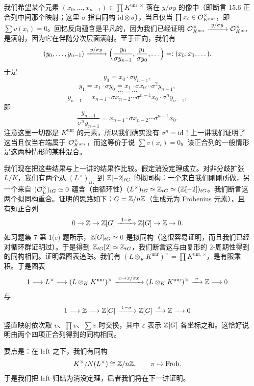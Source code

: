 我们希望某个元素 $(x_{0},\dots,x_{n-1})\in\prod K^{\mathrm{unr},\times}$ 落在 $y/\sigma y$ 的像中（即断言 15.6 正合列中间那个映射；这里 $\sigma$ 指自同构 $\mathrm{id}\otimes\sigma$），当且仅当 $\prod x_{i}\in\mathcal{O}_{K^{\mathrm{unr}}}^{\times}$，即 $\sum v(x_{i})=0$。回忆反向蕴含是平凡的，因为我们已经证明 $\OK_{K^{\mathrm{unr}}}^{\times}\xrightarrow{\ y/\sigma y\ }\OK_{K^{\mathrm{unr}}}^{\times}$ 是满射，因为它在伴随分次层面满射。至于正向，我们有
\[
(y_{0},\dots,y_{n-1})\xrightarrow{\ y/\sigma y\ }\Bigl(\frac{y_{0}}{\sigma y_{n-1}},\frac{y_{1}}{\sigma y_{0}},\dots\Bigr)=:(x_{0},x_{1},\dots).
\]
于是
\[
y_{0}=x_{0}\cdot\sigma y_{n-1},
\]
\[
y_{1}=x_{1}\cdot\sigma y_{0}=x_{1}\cdot\sigma x_{0}\cdots\sigma^{2}y_{n-1},
\]
\[
\cdots=\cdots
\]
\[
y_{n-1}=x_{n-1}\cdot\sigma x_{n-2}\cdots\sigma^{n-1}x_{0}\cdot\sigma^{n}y_{n-1},
\]
即
\[
\frac{y_{n-1}}{\sigma^{n}y_{n-1}}=x_{n-1}\cdot\sigma x_{n-2}\cdots\sigma^{n-1}x_{0}.
\]
注意这里一切都是 $K^{\mathrm{unr}}$ 的元素，所以我们确实没有 $\sigma^{n}=\mathrm{id}$！上一讲我们证明了这当且仅当右端属于 $\mathcal{O}_{K^{\mathrm{unr}}}^{\times}$，而这等价于说 $\sum v(x_{i})=0$。该正合列的一般情形是这两种情形的某种混合。

我们现在把这些结果与上一讲的结果作比较。假定消没定理成立。对非分歧扩张 $L/K$，我们有两个从 $(L^{\times})_{tG}$ 到 $\mathbb{Z}[-2]_{tG}$ 的拟同构：一个来自我们刚刚所做，另一个来自 $(\mathcal{O}_{L}^{\times})_{tG}\simeq 0$ 蕴含（由循环性）$(L^{\times})_{tG}\simeq\mathbb{Z}_{tG}\simeq(\mathbb{Z}[-2])_{tG}$。我们断言这两个拟同构重合。证明的思路如下：$G=\mathbb{Z}/n\mathbb{Z}$（生成元为 Frobenius 元素），且有短正合列
\[
0\to\Z\to\Z[G]\xrightarrow{\ 1-\sigma\ }\Z[G]\to\Z\to 0.
\]
如习题集 7 第 1(e) 题所示，$\mathbb{Z}[G]_{tG}\simeq 0$ 是拟同构（这很容易证明，而且我们已经对循环群证明过）。于是得到 $\mathbb{Z}_{tG}[2]\simeq\mathbb{Z}_{tG}$，我们断言这与由复形的 $2$-周期性得到的同构相同。证明靠图表追踪。我们有 $(L\otimes_{K}K^{\mathrm{unr}})^{\times}=\prod K^{\mathrm{unr},\times}$，是有限乘积。于是图表
\[
1\longrightarrow L^{\times}\longrightarrow(L\otimes_{K}K^{\mathrm{unr}})^{\times}\xrightarrow{\ x\mapsto x/\sigma x\ }(L\otimes_{K}K^{\mathrm{unr}})^{\times}\xrightarrow{\ v\ }\Z\longrightarrow 0
\]
与
\[
1\longrightarrow\Z\longrightarrow\Z[G]\xrightarrow{\ 1-\sigma\ }\Z[G]\xrightarrow{\ \varepsilon\ }\Z\longrightarrow 0
\]
竖直映射依次取 $v$、$\prod v$、$\sum v$ 时交换，其中 $\varepsilon$ 表示 $\mathbb{Z}[G]$ 各坐标之和。这恰好说明由两个四项正合列得到的同构相同。

要点是：在 lcft 之下，我们有同构
\[
K^{\times}/N(L^{\times})\cong\mathbb{Z}/n\mathbb{Z},\qquad\pi\mapsto\mathrm{Frob}.
\]
于是我们把 lcft 归结为消没定理，后者我们将在下一讲证明。
